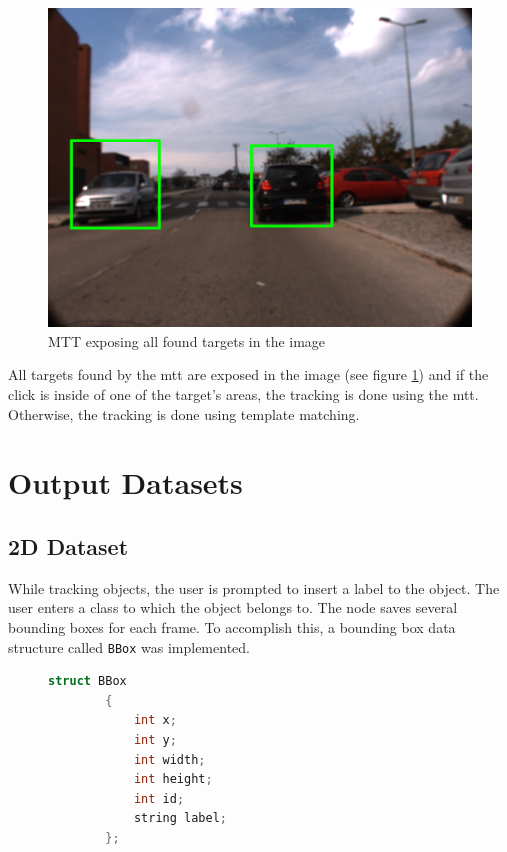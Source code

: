 \begin{figure}[h]
	
	\centering
	\includegraphics[width=.6\textwidth]{caplabel/imgs/mtt_proj.png}
	
	\caption{MTT exposing all found targets in the image}
	\label{fig:mtt_proj}
	
\end{figure}

All targets found by the \gls{mtt} are exposed in the image (see figure \ref{fig:mtt_proj}) and if the click is inside of one of the target's areas, the tracking is done using the \gls{mtt}. Otherwise, the tracking is done using template matching.

\section{Output Datasets}

\subsection{2D Dataset}

While tracking objects, the user is prompted to insert a label to the object. The user enters a class to which the object belongs to. The node saves several bounding boxes for each frame. To accomplish this, a bounding box data structure called \texttt{BBox} was implemented.

\begin{figure}
	\begin{center}
		\begin{lstlisting}[label={lst:BBox2ddef}, caption={BBox struct definition used for 2D datasets.},language=c++]
		struct BBox
		{
			int x;
			int y;
			int width;
			int height;
			int id;
			string label;
		};\end{lstlisting}
	\end{center}
\end{figure}

